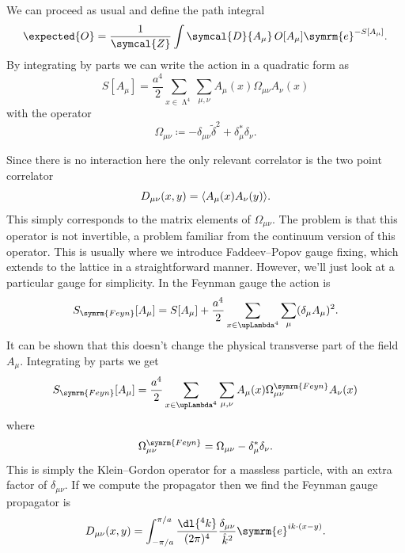 \documentclass[fleqn]{NotesClass}
\newcommand{\e}{\symrm{e}}
\newcommand{\DL}[1]{\symcal{D}{#1}}
\DeclarePairedDelimiter{\correlator}{\langle}{\rangle}
\newcommand{\partitionFunction}{\symcal{Z}}
\newcommand{\lattice}[1][4]{\upLambda^{#1}}
\newcommand{\forwardDerivative}{\delta}
\newcommand{\backwardDerivative}{\delta^*}
\newcommand{\mixedLaplacian}{{\widetilde{\delta}^2}}
\begin{document}
    We can proceed as usual and define the path integral
    \begin{equation}
        \expected{O} = \frac{1}{\partitionFunction} \int\DL{A_\mu} \, O[A_\mu] \e^{-S[A_\mu]}.
    \end{equation}
    By integrating by parts we can write the action in a quadratic form as
    \begin{equation}
        S[A_\mu] = \frac{a^4}{2} \sum_{x\in\lattice} \sum_{\mu,\nu} A_\mu(x) \Omega_{\mu\nu} A_\nu(x)
    \end{equation}
    with the operator
    \begin{equation}
        \Omega_{\mu\nu} \coloneqq -\delta_{\mu\nu} \mixedLaplacian + \backwardDerivative_\mu \forwardDerivative_\nu.
    \end{equation}
    
    Since there is no interaction here the only relevant correlator is the two point correlator
    \begin{equation}
        D_{\mu\nu}(x, y) = \correlator{A_\mu(x)A_\nu(y)}.
    \end{equation}
    This simply corresponds to the matrix elements of \(\Omega_{\mu\nu}\).
    The problem is that this operator is not invertible, a problem familiar from the continuum version of this operator.
    This is usually where we introduce Faddeev--Popov gauge fixing, which extends to the lattice in a straightforward manner.
    However, we'll just look at a particular gauge for simplicity.
    In the Feynman gauge the action is
    \begin{equation}
        S_{\symrm{Feyn}}[A_\mu] = S[A_\mu] + \frac{a^4}{2} \sum_{x\in\lattice} \sum_\mu (\forwardDerivative_\mu A_\mu)^2.
    \end{equation}
    It can be shown that this doesn't change the physical transverse part of the field \(A_\mu\).
    Integrating by parts we get
    \begin{equation}
        S_{\symrm{Feyn}}[A_\mu] = \frac{a^4}{2}\sum_{x\in\lattice} \sum_{\mu,\nu} A_\mu(x) \Omega_{\mu\nu}^{\symrm{Feyn}}A_\nu(x)
    \end{equation}
    where
    \begin{equation}
        \Omega_{\mu\nu}^{\symrm{Feyn}} = \Omega_{\mu\nu} - \backwardDerivative_\mu \forwardDerivative_\nu.
    \end{equation}
    This is simply the Klein--Gordon operator for a massless particle, with an extra factor of \(\delta_{\mu\nu}\).
    If we compute the propagator then we find the Feynman gauge propagator is
    \begin{equation}
        D_{\mu\nu}(x, y) = \int_{-\pi/a}^{\pi/a} \frac{\dl{^4k}}{(2\pi)^4} \frac{\delta_{\mu\nu}}{\hat{k}^2} \e^{ik\cdot (x - y)}.
    \end{equation}
    
\end{document}
